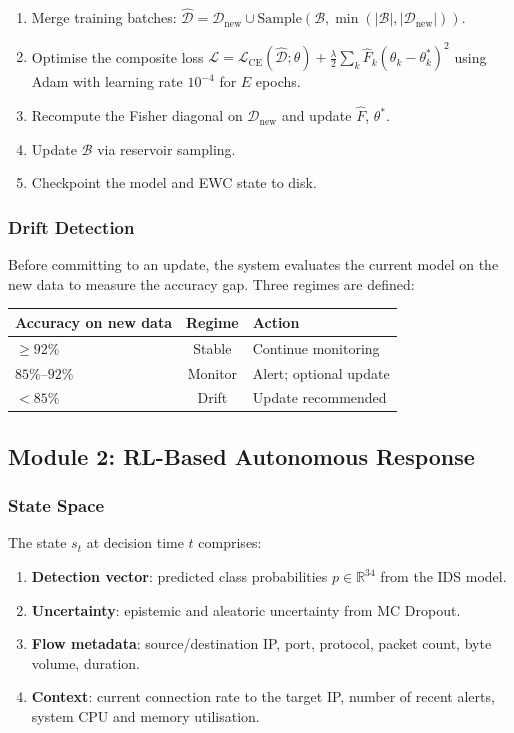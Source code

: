 \documentclass[12pt,a4paper]{article}
\theoremstyle{definition}
\begin{document}
\begin{enumerate}
\item Merge training batches: $\hat{\mathcal{D}} = \mathcal{D}_{\text{new}} \cup \text{Sample}(\mathcal{B}, \min(|\mathcal{B}|, |\mathcal{D}_{\text{new}}|))$.
\item Optimise the composite loss $\mathcal{L} = \mathcal{L}_{\text{CE}}(\hat{\mathcal{D}}; \theta) + \frac{\lambda}{2} \sum_k \hat{F}_k (\theta_k - \theta_k^{*})^2$ using Adam with learning rate $10^{-4}$ for $E$ epochs.
\item Recompute the Fisher diagonal on $\mathcal{D}_{\text{new}}$ and update $\hat{F}$, $\theta^{*}$.
\item Update $\mathcal{B}$ via reservoir sampling.
\item Checkpoint the model and EWC state to disk.
\end{enumerate}

\subsubsection{Drift Detection}

Before committing to an update, the system evaluates the current model on the new data to measure the accuracy gap.
Three regimes are defined:

\begin{center}
\begin{tabular}{lcl}
\toprule
Accuracy on new data & Regime & Action \\
\midrule
$\geq 92\%$ & Stable & Continue monitoring \\
$85\%$--$92\%$ & Monitor & Alert; optional update \\
$< 85\%$ & Drift & Update recommended \\
\bottomrule
\end{tabular}
\end{center}

\subsection{Module 2: RL-Based Autonomous Response}

\subsubsection{State Space}

The state $s_t$ at decision time $t$ comprises:

\begin{enumerate}
\item \textbf{Detection vector}: predicted class probabilities $p \in \mathbb{R}^{34}$ from the IDS model.
\item \textbf{Uncertainty}: epistemic and aleatoric uncertainty from MC Dropout.
\item \textbf{Flow metadata}: source/destination IP, port, protocol, packet count, byte volume, duration.
\item \textbf{Context}: current connection rate to the target IP, number of recent alerts, system CPU and memory utilisation.
\end{enumerate}
\end{document}
